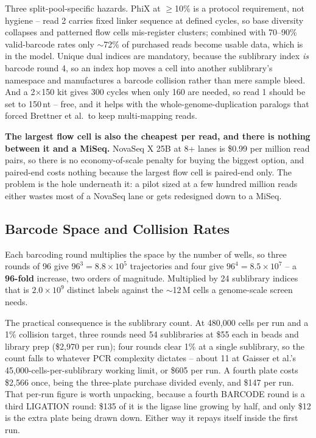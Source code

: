 Three split-pool-specific hazards. PhiX at $\ge$10\% is a protocol requirement, not
hygiene -- read 2 carries fixed linker sequence at defined cycles, so base
diversity collapses and patterned flow cells mis-register clusters; combined with
70--90\% valid-barcode rates only $\sim$72\% of purchased reads become usable data,
which is in the model. Unique dual indices are mandatory, because the sublibrary
index \emph{is} barcode round 4, so an index hop moves a cell into another
sublibrary's namespace and manufactures a barcode collision rather than mere sample
bleed. And a 2$\times$150 kit gives 300 cycles when only 160 are needed, so read 1
should be set to 150\,nt -- free, and it helps with the whole-genome-duplication
paralogs that forced Brettner et al.\ to keep multi-mapping reads.

\begin{keybox}
\textbf{The largest flow cell is also the cheapest per read, and there is
nothing between it and a MiSeq.} NovaSeq X 25B at 8+ lanes is \$0.99 per million
read pairs, so there is no economy-of-scale penalty for buying the biggest
option, and paired-end costs nothing because the largest flow cell is
paired-end only. The problem is the hole underneath it: a pilot sized at a few
hundred million reads either wastes most of a NovaSeq lane or gets redesigned
down to a MiSeq.
\end{keybox}

\subsection{Barcode Space and Collision Rates}
\label{sec:collisions}



 Each barcoding round multiplies the
space by the number of wells, so three rounds of 96 give $96^{3}=8.8\times10^{5}$
trajectories and four give $96^{4}=8.5\times10^{7}$ -- a \textbf{96-fold}
increase, two orders of magnitude. Multiplied by 24 sublibrary indices that is
$2.0\times10^{9}$ distinct labels against the $\sim$12\,M cells a genome-scale
screen needs.

The practical consequence is the sublibrary count. At 480{,}000 cells per run and
a 1\% collision target, three rounds need 54 sublibraries at \$55 each in beads
and library prep (\$2{,}970 per run); four rounds clear 1\% at a single
sublibrary, so the count falls to whatever PCR complexity dictates -- about 11 at
Gaisser et al.'s 45{,}000-cells-per-sublibrary working limit, or \$605 per run.
A fourth plate costs \$2{,}566 once, being the three-plate purchase divided
evenly, and \$147 per run. That per-run figure is worth unpacking, because a
fourth BARCODE round is a third LIGATION round: \$135 of it is the ligase line
growing by half, and only \$12 is the extra plate being drawn down. Either way
it repays itself inside the first run.

